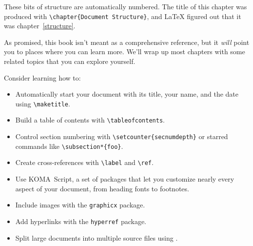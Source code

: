 These bits of structure are automatically numbered.
The title of this chapter was produced with \verb|\chapter{Document Structure}|,
and \LaTeX{} figured out that it was chapter~\ref{structure}.

\exercises{}

As promised, this book isn't meant as a comprehensive reference,
but it \emph{will} point you to places where you can learn more.
We'll wrap up most chapters with some related topics that you can
explore yourself.

Consider learning how to:
\begin{itemize}
\item Automatically start your document with its title, your name,
    and the date using \verb|\maketitle|.
\item Build a table of contents
    with \verb|\tableofcontents|.
\item Control section numbering with \verb|\setcounter{secnumdepth}|
or starred commands like \verb|\subsection*{foo}|.
\item Create cross-references with \verb|\label| and \verb|\ref|.
\item Use KOMA~Script, a set of packages that let you customize nearly every
    aspect of your document, from heading fonts to footnotes.
\item Include images with the \texttt{graphicx} package.
\item Add hyperlinks with the \texttt{hyperref} package.
\item Split large documents into multiple source files using \verb||.
\end{itemize}
